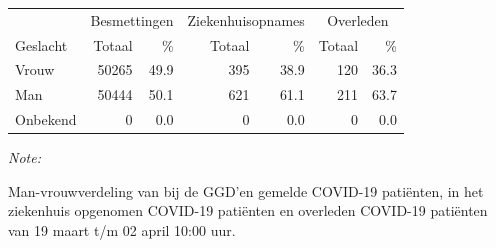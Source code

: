 \documentclass[
  english,
  man,floatsintext]{apa6}
\begin{document}
\begin{table}
\centering\begingroup\fontsize{11}{13}\selectfont

\begin{threeparttable}
\begin{tabular}{lrrrrrr}
\toprule
\multicolumn{1}{c}{ } & \multicolumn{2}{c}{Besmettingen} & \multicolumn{2}{c}{Ziekenhuisopnames} & \multicolumn{2}{c}{Overleden} \\
\cmidrule(l{3pt}r{3pt}){2-3} \cmidrule(l{3pt}r{3pt}){4-5} \cmidrule(l{3pt}r{3pt}){6-7}
Geslacht & Totaal & \% & Totaal & \% & Totaal & \%\\
\midrule
Vrouw & 50265 & 49.9 & 395 & 38.9 & 120 & 36.3\\
Man & 50444 & 50.1 & 621 & 61.1 & 211 & 63.7\\
Onbekend & 0 & 0.0 & 0 & 0.0 & 0 & 0.0\\
\bottomrule
\end{tabular}
\begin{tablenotes}
\item \textit{Note: } 
\item Man-vrouwverdeling van bij de GGD’en gemelde COVID-19 patiënten, in het ziekenhuis opgenomen COVID-19 patiënten en overleden COVID-19 patiënten van 19 maart t/m 02 april 10:00 uur.
\end{tablenotes}
\end{threeparttable}
\endgroup{}
\end{table}
\newpage
\end{document}
